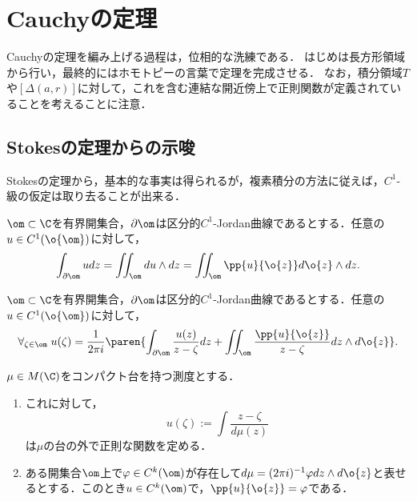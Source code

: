 \documentclass[uplatex, dvipdfmx]{jsreport}
\begin{document}
\section{Cauchyの定理}

\begin{tcolorbox}[colframe=ForestGreen, colback=ForestGreen!10!white,breakable,colbacktitle=ForestGreen!40!white,coltitle=black,fonttitle=\bfseries\sffamily,
title=]
    Cauchyの定理を編み上げる過程は，位相的な洗練である．
    はじめは長方形領域から行い，最終的にはホモトピーの言葉で定理を完成させる．
    なお，積分領域$T$や$[\Delta(a,r)]$に対して，これを含む連結な開近傍上で正則関数が定義されていることを考えることに注意．
\end{tcolorbox}

\subsection{Stokesの定理からの示唆}

\begin{tcolorbox}[colframe=ForestGreen, colback=ForestGreen!10!white,breakable,colbacktitle=ForestGreen!40!white,coltitle=black,fonttitle=\bfseries\sffamily,
title=]
    Stokesの定理から，基本的な事実は得られるが，複素積分の方法に従えば，$C^1$-級の仮定は取り去ることが出来る．
\end{tcolorbox}

\begin{theorem}
    $\om\subset\C$を有界開集合，$\partial\om$は区分的$C^1$-Jordan曲線であるとする．任意の$u\in C^1(\o{\om})$に対して，
    \[\int_{\partial\om}udz=\iint_\om du\land dz=\iint_\om\pp{u}{\o{z}}d\o{z}\wedge dz.\]
\end{theorem}

\begin{corollary}
    $\om\subset\C$を有界開集合，$\partial\om$は区分的$C^1$-Jordan曲線であるとする．任意の$u\in C^1(\o{\om})$に対して，
    \[\forall_{\zeta\in\om}\; u(\zeta)=\frac{1}{2\pi i}\paren{\int_{\partial\om}\frac{u(z)}{z-\zeta}dz+\iint_\om\frac{\pp{u}{\o{z}}}{z-\zeta}dz\wedge d\o{z}}.\]
\end{corollary}

\begin{theorem}
    $\mu\in M(\C)$をコンパクト台を持つ測度とする．
    \begin{enumerate}
        \item これに対して，
        \[u(\zeta):=\int\frac{z-\zeta}{d\mu(z)}\]
        は$\mu$の台の外で正則な関数を定める．
        \item ある開集合$\om$上で$\varphi\in C^k(\om)$が存在して$d\mu=(2\pi i)^{-1}\varphi dz\wedge d\o{z}$と表せるとする．このとき$u\in C^k(\om)$で，$\pp{u}{\o{z}}=\varphi$である．
    \end{enumerate}
\end{theorem}
\end{document}
